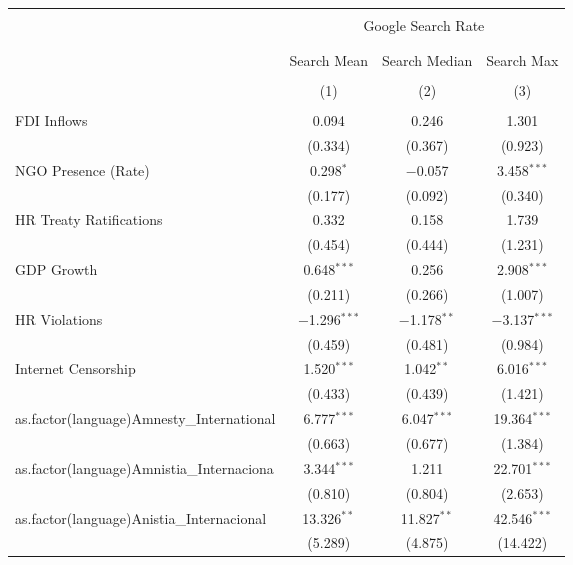
\begin{table}[!htbp] \centering 
  \caption{} 
  \label{} 
\begin{tabular}{@{\extracolsep{5pt}}lccc} 
\\[-1.8ex]\hline 
\hline \\[-1.8ex] 
 & \multicolumn{3}{c}{Google Search Rate} \\ 
\cline{2-4} 
\\[-1.8ex] & \multicolumn{3}{c}{ } \\ 
 & Search Mean & Search Median & Search Max \\ 
\\[-1.8ex] & (1) & (2) & (3)\\ 
\hline \\[-1.8ex] 
 FDI Inflows & 0.094 & 0.246 & 1.301 \\ 
  & (0.334) & (0.367) & (0.923) \\ 
  NGO Presence (Rate) & 0.298$^{*}$ & $-$0.057 & 3.458$^{***}$ \\ 
  & (0.177) & (0.092) & (0.340) \\ 
  HR Treaty Ratifications & 0.332 & 0.158 & 1.739 \\ 
  & (0.454) & (0.444) & (1.231) \\ 
  GDP Growth & 0.648$^{***}$ & 0.256 & 2.908$^{***}$ \\ 
  & (0.211) & (0.266) & (1.007) \\ 
  HR Violations & $-$1.296$^{***}$ & $-$1.178$^{**}$ & $-$3.137$^{***}$ \\ 
  & (0.459) & (0.481) & (0.984) \\ 
  Internet Censorship & 1.520$^{***}$ & 1.042$^{**}$ & 6.016$^{***}$ \\ 
  & (0.433) & (0.439) & (1.421) \\ 
  as.factor(language)Amnesty\_International & 6.777$^{***}$ & 6.047$^{***}$ & 19.364$^{***}$ \\ 
  & (0.663) & (0.677) & (1.384) \\ 
  as.factor(language)Amnistia\_Internaciona & 3.344$^{***}$ & 1.211 & 22.701$^{***}$ \\ 
  & (0.810) & (0.804) & (2.653) \\ 
  as.factor(language)Anistia\_Internacional & 13.326$^{**}$ & 11.827$^{**}$ & 42.546$^{***}$ \\ 
  & (5.289) & (4.875) & (14.422) \\ 

\end{tabular}
\end{table}
